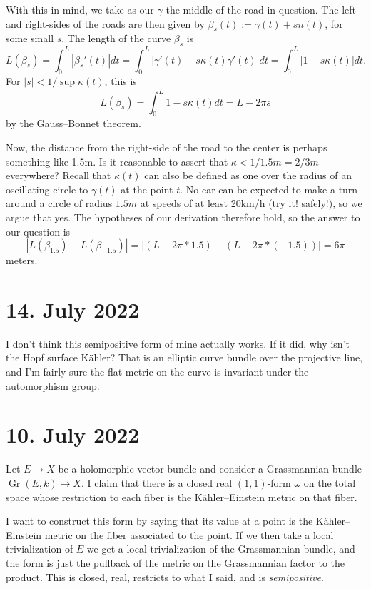 \documentclass[11pt]{article}
\theoremstyle{definition}
\DeclareMathOperator{\Gr}{Gr}
\begin{document}
With this in mind, we take as our $\gamma$ the middle of the road in question.
The left- and right-sides of the roads are then given by $\beta_s(t) := \gamma(t)
+ s n(t)$, for some small $s$.
The length of the curve $\beta_s$ is
$$
L(\beta_s)
= \int_0^L |\beta_s'(t)| dt
= \int_0^L |\gamma'(t) - s \kappa(t) \gamma'(t)| dt
= \int_0^L |1 - s \kappa(t)| dt.
$$
For $|s| < 1/ \sup \kappa(t)$, this is
$$
L(\beta_s)
= \int_0^L 1 - s \kappa(t) dt
= L - 2\pi s
$$
by the Gauss--Bonnet theorem.

Now, the distance from the right-side of the road to the center is perhaps something like 1.5m.
Is it reasonable to assert that $\kappa < 1/1.5m = 2/3m$ everywhere?
Recall that $\kappa(t)$ can also be defined as one over the radius of an oscillating circle to $\gamma(t)$ at the point $t$.
No car can be expected to make a turn around a circle of radius $1.5m$ at speeds
of at least 20km/h (try it! safely!), so we argue that yes.
The hypotheses of our derivation therefore hold, so the answer to our question is
$$
|L(\beta_{1.5}) - L(\beta_{-1.5})|
= |(L - 2\pi * 1.5) - (L - 2\pi * (-1.5))|
= 6\pi
$$
meters.



\section*{14. July 2022}

I don't think this semipositive form of mine actually works. If it did, why
isn't the Hopf surface K\"ahler? That is an elliptic curve bundle over the
projective line, and I'm fairly sure the flat metric on the curve is invariant
under the automorphism group.


\section*{10. July 2022}

Let $E \to X$ be a holomorphic vector bundle and consider a Grassmannian bundle
$\Gr(E,k) \to X$. I claim that there is a closed real $(1,1)$-form $\omega$ on
the total space whose restriction to each fiber is the K\"ahler--Einstein metric
on that fiber.

I want to construct this form by saying that its value at a point is the
K\"ahler--Einstein metric on the fiber associated to the point. If we then take
a local trivialization of $E$ we get a local trivialization of the Grassmannian
bundle, and the form is just the pullback of the metric on the Grassmannian
factor to the product. This is closed, real, restricts to what I said, and is
\emph{semipositive}.
\end{document}
